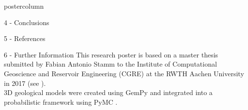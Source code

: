 \documentclass{beamer}
\begin{document}
\begin{frame}
\begin{columns}
\begin{column}{.249\textwidth}
\begin{beamercolorbox}[center]{postercolumn}
\begin{minipage}{.98\textwidth}
{\begin{myblock}{4 - Conclusions}
	


\end{myblock}			
								
					
\begin{myblock}{5 - References}
	\footnotesize
	
\end{myblock}

\begin{myblock}{6 - Further Information}
This research poster is based on a master thesis submitted by Fabian Antonio Stamm to the Institute of Computational Geoscience and Reservoir Engineering (CGRE) at the RWTH Aachen University in 2017 (see \citet{stamm2017}). \\
3D geological models were created using GemPy \citep{gmd-2018-61} and integrated into a probabilistic framework using PyMC \citep{salvatier2016pymc3}.
		

			
		



\end{myblock}\vfill		
				
	}\end{minipage}\end{beamercolorbox}
		\end{column}
		
\end{columns}
\end{frame}
\end{document}
